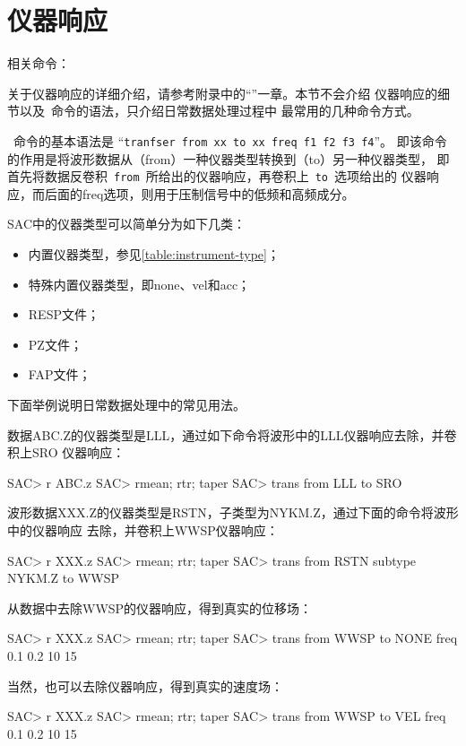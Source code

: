 \section{仪器响应}
\label{sec:instrument-response}
相关命令：

关于仪器响应的详细介绍，请参考附录中的``''一章。本节不会介绍
仪器响应的细节以及~命令的语法，只介绍日常数据处理过程中
最常用的几种命令方式。

~命令的基本语法是
``\verb+tranfser from xx to xx freq f1 f2 f3 f4+''。
即该命令的作用是将波形数据从（from）一种仪器类型转换到（to）另一种仪器类型，
即首先将数据反卷积~\verb+from+~所给出的仪器响应，再卷积上~\verb+to+~选项给出的
仪器响应，而后面的freq选项，则用于压制信号中的低频和高频成分。

SAC中的仪器类型可以简单分为如下几类：
\begin{itemize}
\item 内置仪器类型，参见\ref{table:instrument-type}；
\item 特殊内置仪器类型，即none、vel和acc；
\item RESP文件；
\item PZ文件；
\item FAP文件；
\end{itemize}

下面举例说明日常数据处理中的常见用法。

数据ABC.Z的仪器类型是LLL，通过如下命令将波形中的LLL仪器响应去除，并卷积上SRO
仪器响应：
\begin{SACCode}
SAC> r ABC.z
SAC> rmean; rtr; taper
SAC> trans from LLL to SRO
\end{SACCode}

波形数据XXX.Z的仪器类型是RSTN，子类型为NYKM.Z，通过下面的命令将波形中的仪器响应
去除，并卷积上WWSP仪器响应：
\begin{SACCode}
SAC> r XXX.z
SAC> rmean; rtr; taper
SAC> trans from RSTN subtype NYKM.Z to WWSP
\end{SACCode}

从数据中去除WWSP的仪器响应，得到真实的位移场：
\begin{SACCode}
SAC> r XXX.z
SAC> rmean; rtr; taper
SAC> trans from WWSP to NONE freq 0.1 0.2 10 15
\end{SACCode}

当然，也可以去除仪器响应，得到真实的速度场：
\begin{SACCode}
SAC> r XXX.z
SAC> rmean; rtr; taper
SAC> trans from WWSP to VEL freq 0.1 0.2 10 15
\end{SACCode}

